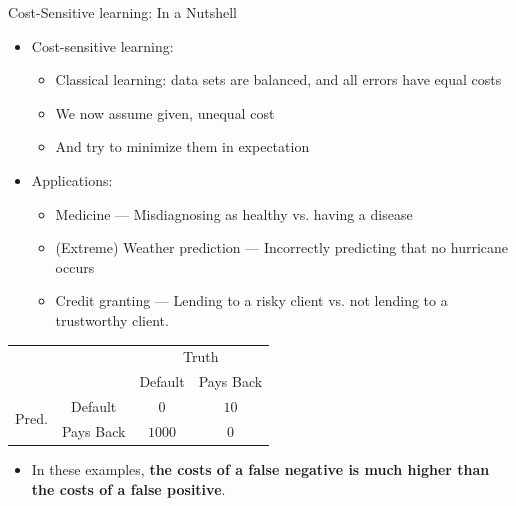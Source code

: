 \documentclass[11pt,compress,t,notes=noshow, xcolor=table]{beamer}
\begin{document}
\begin{frame}{Cost-Sensitive learning: In a Nutshell}
	\scriptsize{

		\begin{itemize}
		
    		\item Cost-sensitive learning: 
                \begin{itemize}
                    \scriptsize
                    \item Classical learning: data sets are balanced, and all errors have equal costs
                    \item We now assume given, unequal cost
                    \item And try to minimize them in expectation

                \end{itemize}
    		
    		\item Applications:
      
    		\begin{itemize}
    			\scriptsize	
    			\item Medicine --- Misdiagnosing as healthy vs. having a disease
    			\item (Extreme) Weather prediction ---  Incorrectly predicting that no hurricane occurs 
    			\item Credit granting --- Lending to a risky client vs. not lending to a trustworthy client.
    		\end{itemize}
         
		
		\end{itemize}
        \vspace{15pt}

        \begin{minipage}{0.49\textwidth}
            \begin{table}[]
                \centering
                \begin{tabular}{p{1cm}c|cc}
                    & &\multicolumn{2}{c}{Truth} \\
                    & & Default & Pays Back  \\
                    \hline
                    \multirow{2}{*}{\parbox{1cm}{Pred.}} & Default & 0 & $ 10 $\\
                    & Pays Back & $1000$ & $0$   \\
                \end{tabular}
            \end{table}
        \end{minipage}
        \hfill
        \begin{minipage}{0.49\textwidth}
            \begin{itemize}
                \scriptsize
                \item In these examples, \textbf{the costs of a false negative is much higher than the costs of a false positive}.
                \vspace{15pt}
                

\end{itemize}
\end{minipage}}
\end{frame}
\end{document}
